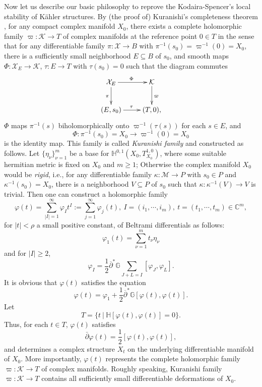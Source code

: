 \documentclass[12pt]{amsart}
\numberwithin{equation}{section}
\renewcommand{\1}{\mathds{1}}
\newcommand{\G}{\mathbb{G}}
\newcommand{\db}{\overline{\partial}}
\renewcommand{\>}{\rightarrow}
\newcommand{\p}{\partial}
\def\p{\partial}
\def\b{\bar}
\def\mc{\mathcal}
\begin{document}
Now let us describe our basic philosophy to reprove the
Kodaira-Spencer's local stability of K\"{a}hler structures.
By (the proof of) Kuranishi's completeness theorem \cite{ku}, for any compact complex manifold $X_0$, there exists a complete holomorphic family
$\varpi:\mc{K}\to T$ of complex manifolds at the reference point $0\in T$ in the sense that for any differentiable family $\pi:\mc{X}\to B$ with $\pi^{-1}(s_0)=\varpi^{-1}(0)=X_0$, there is a sufficiently small neighborhood $E\subseteq B$ of $s_0$, and smooth maps $\Phi: \mathcal {X}_E\rightarrow \mathcal {K}$,  $\tau: E\rightarrow T$ with $\tau(s_0)=0$ such that the diagram commutes
$$\xymatrix{\mathcal {X}_E \ar[r]^{\Phi}\ar[d]_\pi& \mathcal {K}\ar[d]^\varpi\\
(E,s_0)\ar[r]^{\tau}  & (T,0),}$$
$\Phi$ maps $\pi^{-1}(s)$ biholomorphically onto $\varpi^{-1}(\tau(s))$ for each $s\in E$, and $$\Phi: \pi^{-1}(s_0)=X_0\rightarrow \varpi^{-1}(0)=X_0$$ is the identity map.
This family is called \emph{Kuranishi family} and constructed as follows. Let $\{\eta_\nu\}_{\nu=1}^m$ be a base for $\mathbb{H}^{0,1}(X_0,T^{1,0}_{X_0})$, where some suitable hermitian metric is fixed on $X_0$ and $m\geq 1$; Otherwise the complex manifold $X_0$ would be \emph{rigid}, i.e., for any differentiable family $\kappa:\mc{M}\to P$ with $s_0\in P$ and $\kappa^{-1}(s_0)=X_0$, there is a neighborhood $V \subseteq P$ of $s_0$ such that $\kappa:\kappa^{-1}(V)\to V$ is trivial. Then one can construct a holomorphic family
\begin{equation}\label{phi-ps-pp}\varphi(t) = \sum_{|I|=1}^{\infty}\varphi_{I}t^I:=\sum_{j=1}^{\infty}\varphi_j(t),\ I=(i_1,\cdots,i_m),\ t=(t_1,\cdots,t_m)\in \mathbb{C}^m,\end{equation} {for $|t|< \rho$ a small positive constant,} of Beltrami differentials as follows:
\begin{equation}\label{phi-ps-0}
 \varphi_1(t)=\sum_{\nu=1}^{m}t_\nu\eta_\nu
\end{equation}
and for $|I|\geq 2$,
\begin{equation}\label{phi-ps}
  \varphi_I=\frac{1}{2}\db^*\G\sum_{J+L=I}[\varphi_J,\varphi_{L}].
\end{equation}
It is obvious that $\varphi(t)$ satisfies the equation
$$\varphi(t)=\varphi_1+\frac{1}{2}\db^*\G[\varphi(t),\varphi(t)].$$
Let
$$T=\{t\ |\ \mathbb{H}[\varphi(t),\varphi(t)]=0 \}.$$
Thus, for each $t\in T$, $\varphi(t)$ satisfies
\begin{equation}\label{int}
\b{\p}\varphi(t)=\frac{1}{2}[\varphi(t),\varphi(t)],
\end{equation}
and determines a complex structure $X_t$ on the underlying differentiable manifold of $X_0$. More importantly, $\varphi(t)$ represents the complete holomorphic family $\varpi:\mc{K}\to T$ of complex manifolds. Roughly speaking, Kuranishi family $\varpi:\mc{K}\to T$ contains all sufficiently small differentiable deformations of $X_0$.
\end{document}
